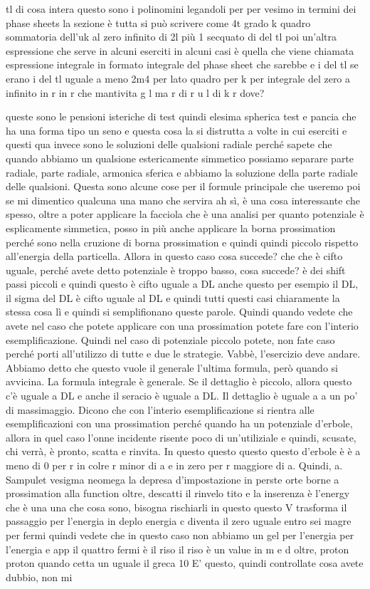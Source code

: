 \begin{soluzione}
tl di cosa intera questo sono i polinomini legandoli per per vesimo in termini dei phase sheets la sezione è tutta si può scrivere come 4t grado k quadro sommatoria dell'uk al zero infinito di 2l più 1 secquato di del tl poi un'altra espressione che serve in alcuni eserciti in alcuni casi è quella che viene chiamata espressione integrale in formato integrale del phase sheet che sarebbe e i del tl se erano i del tl uguale a meno 2m4 per lato quadro per k per integrale del zero a infinito in r in r che mantivita g l ma r di r u l di k r dove?
   
   queste sono le pensioni isteriche di test quindi elesima spherica test e pancia che ha una forma tipo un seno e questa cosa la si distrutta a volte in cui eserciti e questi qua invece sono le soluzioni delle qualsioni radiale perché sapete che quando abbiamo un qualsione estericamente simmetico possiamo separare parte radiale, parte radiale, armonica sferica e abbiamo la soluzione della parte radiale delle qualsioni. Questa sono alcune cose per il formule principale che useremo poi se mi dimentico qualcuna una mano che servira ah sì, è una cosa interessante che spesso, oltre a poter applicare la facciola che è una analisi per quanto potenziale è esplicamente simmetica, posso in più anche applicare la borna prossimation perché sono nella cruzione di borna prossimation e quindi quindi piccolo rispetto all'energia della particella. Allora in questo caso cosa succede? che che è cifto uguale, perché avete detto potenziale è troppo basso, cosa succede? è dei shift passi piccoli e quindi questo è cifto uguale a DL anche questo per esempio il DL, il sigma del DL è cifto uguale al DL e quindi tutti questi casi chiaramente la stessa cosa lì e quindi si semplifionano queste parole. Quindi quando vedete che avete nel caso che potete applicare con una prossimation potete fare con l'interio esemplificazione. Quindi nel caso di potenziale piccolo potete, non fate caso perché porti all'utilizzo di tutte e due le strategie. Vabbè, l'esercizio deve andare. Abbiamo detto che questo vuole il generale l'ultima formula, però quando si avvicina. La formula integrale è generale. Se il dettaglio è piccolo, allora questo c'è uguale a DL e anche il seracio è uguale a DL. Il dettaglio è uguale a a un po' di massimaggio. Dicono che con l'interio esemplificazione si rientra alle esemplificazioni con una prossimation perché quando ha un potenziale d'erbole, allora in quel caso l'onne incidente risente poco di un'utiliziale e quindi, scusate, chi verrà, è pronto, scatta e rinvita. In questo questo questo questo d'erbole è è a meno di 0 per r in colre r minor di a e in zero per r maggiore di a. Quindi, a. Sampulet vesigma neomega la depresa d'impostazione in perste orte borne a prossimation alla function oltre, descatti il rinvelo tito e la inserenza è l'energy che è una una che cosa sono, bisogna rischiarli in questo questo V trasforma il passaggio per l'energia in deplo energia c diventa il zero uguale entro sei magre per fermi quindi vedete che in questo caso non abbiamo un gel per l'energia per l'energia e app il quattro fermi è il riso il riso è un value in m e d oltre, proton proton quando cetta un uguale il greca 10 E' questo, quindi controllate cosa avete dubbio, non mi 
\end{soluzione}
